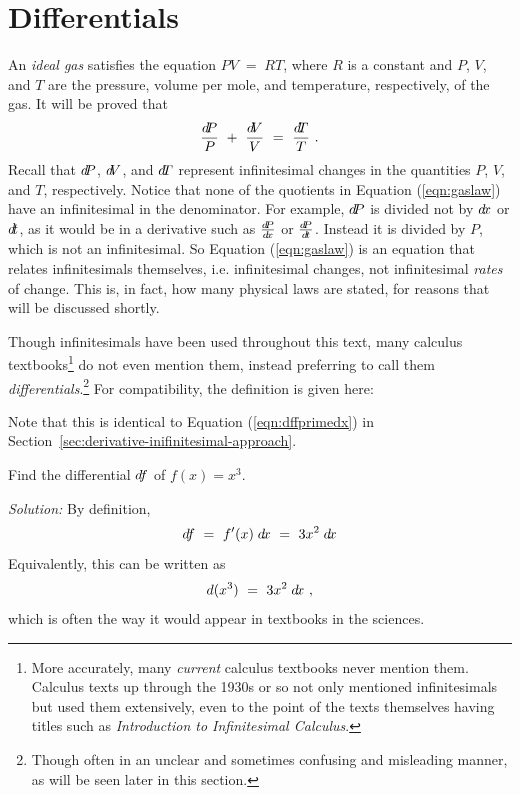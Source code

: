 \section{Differentials}\label{sec:differentials}
An \emph{ideal gas} satisfies the equation $PV \;=\; RT$,
where $R$ is a constant and $P$, $V$, and $T$ are the pressure, volume per
mole, and temperature, respectively, of the gas. It will be proved that
\begin{equation}\label{eqn:gaslaw}
 \dfrac{d\negmedspace P}{P} ~+~ \dfrac{d\negmedspace V}{V} ~=~ \dfrac{d\negmedspace T}{T} ~.
\end{equation}
Recall that $d\negmedspace P$, $d\negmedspace V$, and $d\negmedspace T$ represent infinitesimal changes in the
quantities $P$, $V$, and $T$, respectively. Notice that none of the quotients in
Equation (\ref{eqn:gaslaw}) have an infinitesimal in the denominator. For example,
$d\negmedspace P$ is divided not by $d\!x$ or $d\!t$, as it would be in a derivative such as
$\frac{d\negmedspace P}{d\!x}$ or $\frac{d\negmedspace P}{d\!t}$. Instead it is divided by $P$, which is not
an infinitesimal. So Equation (\ref{eqn:gaslaw}) is an equation that relates
infinitesimals themselves, i.e. infinitesimal changes, not infinitesimal
\emph{rates} of change. This is, in fact, how many physical laws are stated, for
reasons that will be discussed shortly.

Though infinitesimals have been used
throughout this text, many calculus textbooks\footnote{More accurately, many
\emph{current} calculus textbooks never mention them. Calculus texts up through
the 1930s or so not only mentioned infinitesimals but used them extensively,
even to the point of the texts themselves having titles such as \emph{Introduction
to Infinitesimal Calculus}.} do not even mention them, instead preferring to call
them \emph{differentials}.\footnote{Though often in an unclear and sometimes
confusing and misleading manner, as will be seen later in this section.} For
compatibility, the definition is given here:

Note that this is identical to Equation (\ref{eqn:dffprimedx}) in Section~\ref{sec:derivative-inifinitesimal-approach}.

\begin{exmp}\label{exmp:diff1}
\noindent Find the differential $d\negmedspace f$ of $f(x) = x^3$.\vspace{1mm}
\par\noindent\emph{Solution:} By definition,
\[
d\negmedspace f ~=~ f'(x)\;d\!x ~=~ 3x^2\;d\!x
\]
Equivalently, this can be written as
\[
d(x^3) ~=~ 3x^2\;d\!x ~,
\]
which is often the way it would appear in textbooks in the sciences.
\end{exmp}
\divider
\vspace{3mm}

